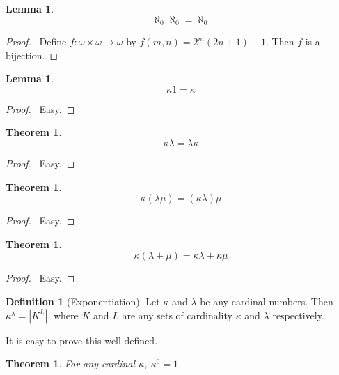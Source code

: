 \documentclass{article}
\let\qed\relax
\newtheorem{lemma}[axiom]{Lemma}
\newtheorem{theorem}[axiom]{Theorem}
\theoremstyle{definition}
\newtheorem{definition}[axiom]{Definition}
\begin{document}
    \begin{lemma}
        \[ \aleph_0 \aleph_0 = \aleph_0 \]
    \end{lemma}

    \begin{proof}
        \pf\ Define $f : \omega \times \omega \rightarrow \omega$ by $f(m,n) = 2^m(2n+1)-1$. Then $f$
        is a bijection. \qed
    \end{proof}

    \begin{lemma}
        \[ \kappa 1 = \kappa \]
    \end{lemma}

    \begin{proof}
        \pf\ Easy. \qed
    \end{proof}

    \begin{theorem}
        \[ \kappa \lambda = \lambda \kappa \]
    \end{theorem}

    \begin{proof}
        \pf\ Easy. \qed
    \end{proof}

    \begin{theorem}
        \[ \kappa (\lambda \mu) = (\kappa \lambda) \mu \]
    \end{theorem}

    \begin{proof}
        \pf\ Easy. \qed
    \end{proof}

    \begin{theorem}
        \[ \kappa (\lambda + \mu) = \kappa \lambda + \kappa \mu \]
    \end{theorem}

    \begin{proof}
        \pf\ Easy. \qed
    \end{proof}

    \begin{definition}[Exponentiation]
        Let $\kappa$ and $\lambda$ be any cardinal numbers. Then $\kappa^\lambda = |K^L|$,
        where $K$ and $L$ are any sets of cardinality $\kappa$ and $\lambda$ respectively.
    \end{definition}

    It is easy to prove this well-defined.

    \begin{theorem}
        For any cardinal $\kappa$, $\kappa^0 = 1$.
    \end{theorem}
\end{document}
